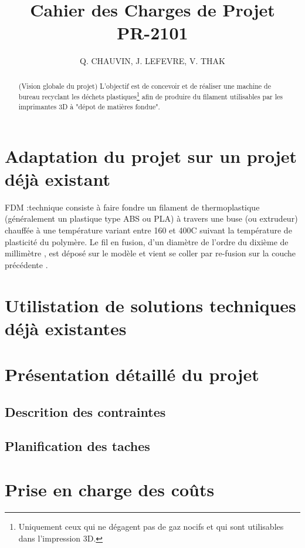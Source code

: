 \documentclass[a4paper,11pt]{article}
\title{Cahier des Charges de Projet\\PR-2101}
\author{Q. CHAUVIN, J. LEFEVRE, V. THAK}
\begin{document}
\maketitle

\begin{abstract}
(Vision globale du projet)
L'objectif est de concevoir et de réaliser une machine de bureau recyclant les déchets plastiques\footnote{Uniquement ceux qui ne dégagent pas de gaz nocifs et qui sont utilisables dans l'impression 3D.} afin de produire du filament utilisables par les imprimantes 3D à "dépot de matières fondue". 
\end{abstract}

\section{Adaptation du projet sur un projet déjà existant}

FDM :technique consiste à faire fondre un filament de thermoplastique (généralement un plastique type ABS ou PLA) à travers une buse (ou extrudeur) chauffée à une température variant entre 160 et 400\textdegree  C suivant la température de plasticité du polymère. Le fil en fusion, d'un diamètre de l'ordre du dixième de millimètre , est déposé sur le modèle et vient se coller par re-fusion sur la couche précédente .

\section{Utilistation de solutions techniques déjà existantes}

\section{Présentation détaillé du projet}
\subsection{Descrition des contraintes}
\subsection{Planification des taches}
\section{Prise en charge des coûts}
\end{document}
